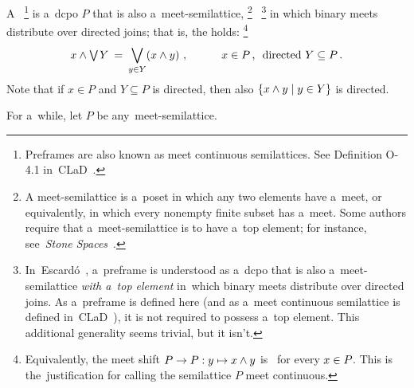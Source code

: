 \documentclass[11pt,letterpaper]{article}
\renewcommand{\emph}[1]{\textit{#1\/}}
\begin{document}
A~%
%
\footnote{Preframes are also known as meet continuous semilattices.
See Definition O-4.1 in~CLaD~\cite{CLaD}.}
%
is a~dcpo $P$ that is also a~meet-semilattice,%
%
\footnote{A meet-semilattice is a~poset in which any two elements have a~meet,
	or equivalently, in which every nonempty finite subset has a~meet.
Some authors require that a~meet-semilattice is to have a~top element;
for instance, see~\textit{Stone Spaces\/}~\cite{johnstoneSS}.}%
%
\,%
%
\footnote{In~Escard\'o~\cite{escardo},
a~preframe is understood as a~dcpo that is also a~meet-semilattice \emph{with a~top element}
in~which binary meets distribute over directed joins.
As a~preframe is defined here
	{\larger(}and as a~meet continuous semilattice is defined in~CLaD~\cite{CLaD}{\larger)},
it is not required to possess a~top element.
This additional generality seems trivial, but it isn't.}
%
in which binary meets distribute over directed joins;
that is, the  holds:%
%
\footnote{Equivalently, the meet shift $P\to P : y\mapsto x\wedge y$
	is \Scottcont\ for every $x\in P\mspace{-1mu}$.
This is the~justification for calling the semilattice $P$ meet continuous.}
%
%
\begin{equation*}
x\wedge\mathop{\textstyle\bigvee}\nolimits\mspace{-1mu} Y \:=\: \bigvee_{y\in Y} (x\wedge y)~,
	\qquad\quad \text{$x\in P$\,, \ directed $Y\subseteq P$}\,.
\end{equation*}
%
Note that if $x\in P$ and $Y\subseteq P$ is directed,
	then also $\{ x\wedge y\mid y\in Y \}$ is directed.

\txtskip

For a~while, let $P$ be any~meet-semilattice.

\txtskip
\end{document}
